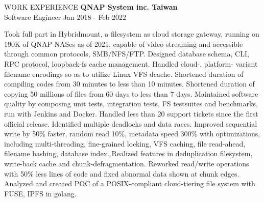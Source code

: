 \documentclass{resume} %
\begin{document}
\begin{rSection}{WORK EXPERIENCE}
\textbf{QNAP System inc. \hfill Taiwan}
\\{Software Engineer \hfill Jan 2018 - Feb 2022}%
\begin{outline}
  \1 Took full part in Hybridmount, a filesystem as cloud storage gateway, running on 190K of QNAP NASes as of 2021, capable of video streaming and accessible through common protocols, SMB/NFS/FTP.
  \1 Designed database schema, CLI, RPC protocol, loopback-fs cache management.
  \1 Handled cloud-, platform- variant filename encodings so as to utilize Linux VFS dcache.
  \1 Shortened duration of compiling codes from 30 minutes to less than 10 minutes.
  \1 Shortened duration of copying 50 millions of files from 60 days to less than 7 days.
  \1 Maintained software quality by composing unit tests, integration tests, FS testsuites and benchmarks, run with Jenkins and Docker. Handled less than 20 support tickets since the first official release.
  \1 Identified multiple deadlocks and data races. Improved sequential write
    by 50\% faster, random read 10\%, metadata speed 300\% with optimizations, including multi-threading, fine-grained locking, VFS caching, file read-ahead, filename hashing, database index.
  \1 Realized features in deduplication filesystem, write-back cache and
    chunk-defragmentation. Reworked read/write operations with 50\% less lines
    of code and fixed abnormal data shown at chunk edges.
  \1 Analyzed and created POC of a POSIX-compliant cloud-tiering file system with FUSE, IPFS in golang.
\end{outline}%
\end{rSection}%

\end{document}

